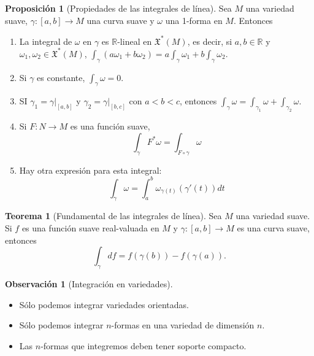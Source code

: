 \documentclass[spanish]{article}
\theoremstyle{definition}
\newtheorem*{teo}{Teorema}
\newtheorem*{prop}{Proposición}
\newtheorem*{obs}{Observación}
\newcommand{\R}{\mathbb{R}}
\newcommand{\X}{\mathfrak{X}}
\begin{document}
	\begin{prop}[Propiedades de las integrales de línea]
		Sea $M$ una variedad suave, $\gamma:[a,b]\to M$ una curva suave y $\omega$ una 1-forma en $M$. Entonces
		\begin{enumerate}
			\item La integral de $\omega$ en $\gamma$ es $\R$-lineal en $\X^*(M)$, es decir, si $a,b\in\R$ y $\omega_1,\omega_2\in\X^*(M)$,
			$\int_\gamma(a\omega_1+b\omega_2)=a\int_\gamma\omega_1+b\int_\gamma\omega_2$.
			\item Si $\gamma$ es constante, $\int_\gamma\omega=0$.
			\item SI $\gamma_1=\gamma|_{[a,b]}$ y $\gamma_2=\gamma|_{[b,c]}$ con $a<b<c$, entonces
			$\int_\gamma\omega=\int_{\gamma_1}\omega+\int_{\gamma_2}\omega$.
			\item
			Si $F:N\to M$ es una función suave,
			\[\int_\gamma F^*\omega=\int_{F\circ \gamma}\omega\]
			\item Hay otra expresión para esta integral: \[\int_\gamma\omega=\int_a^b\omega_{\gamma(t)}(\gamma'(t))dt\]
		\end{enumerate}
	\end{prop}
	\begin{teo}[Fundamental de las integrales de línea]
		Sea $M$ una variedad suave. Si $f$ es una función suave real-valuada en $M$ y $\gamma:[a,b]\to M$ es una curva suave, entonces
		\[\int_\gamma df=f(\gamma(b))-f(\gamma(a)).\]
	\end{teo}
	\fi
	\begin{obs}[Integración en variedades]\leavevmode
		\begin{itemize}
			\item Sólo podemos integrar variedades orientadas.
			\item Sólo podemos integrar $n$-formas en una variedad de dimensión $n$.
			\item Las $n$-formas que integremos deben tener soporte compacto.
		\end{itemize}
	\end{obs}
\end{document}
